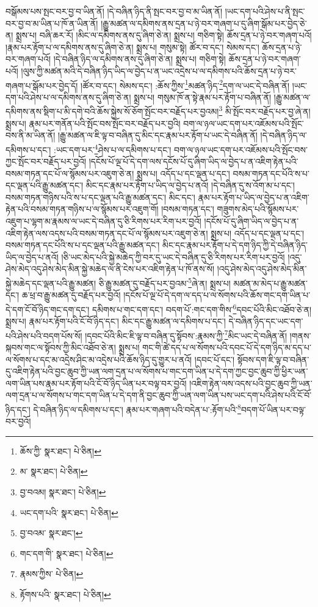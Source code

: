 བསྒོམས་པས་སྤང་བར་བྱ་བ་ཡིན་ནོ། །དེ་བཞིན་ཉིད་ནི་སྤང་བར་བྱ་བ་མ་ཡིན་ནོ། །ཡང་དག་པའི་ཤེས་པ་ནི་སྤང་བར་བྱ་བ་མ་ཡིན་པ་ཁོ་ན་ཡིན་ནོ། །རྒྱུ་མཚན་ལ་དམིགས་ནས་དྲན་པ་ཉེ་བར་གཞག་པ་དུ་ཞིག་སྒོམ་པར་བྱེད་ཅེ་ན། སྨྲས་པ། བཞི་ཆར་རོ། །མིང་ལ་དམིགས་ནས་དུ་ཞིག་ཅེ་ན། སྨྲས་པ། གཅིག་སྟེ། ཆོས་དྲན་པ་ཉེ་བར་གཞག་པའོ། །རྣམ་པར་རྟོག་པ་ལ་དམིགས་ནས་དུ་ཞིག་ཅེ་ན། སྨྲས་པ། གསུམ་སྟེ། ཚོར་བ་དང་། སེམས་དང་། ཆོས་དྲན་པ་ཉེ་བར་གཞག་པའོ། །དེ་བཞིན་ཉིད་ལ་དམིགས་ནས་དུ་ཞིག་ཅེ་ན། སྨྲས་པ། གཅིག་སྟེ། ཆོས་དྲན་པ་ཉེ་བར་གཞག་པའོ། །ལུས་ཀྱི་མཚན་མའི་དེ་བཞིན་ཉིད་ཡིད་ལ་བྱེད་པ་ན་ཡང་འདྲེས་པ་ལ་དམིགས་པའི་ཆོས་དྲན་པ་ཉེ་བར་གཞག་པ་སྒོམ་པར་བྱེད་དོ། །ཚོར་བ་དང་། སེམས་དང་། :ཆོས་ཀྱིས་\footnote{ཆོས་ཀྱི་  སྣར་ཐང་།  པེ་ཅིན། }མཚན་ཉིད་\footnote{མ་  སྣར་ཐང་།  པེ་ཅིན། }དག་ལ་ཡང་དེ་བཞིན་ནོ། །ཡང་དག་པའི་ཤེས་པ་ལ་དམིགས་ནས་དུ་ཞིག་ཅེ་ན། སྨྲས་པ། གསུམ་ཁོ་ན་སྟེ་རྣམ་པར་རྟོག་པ་བཞིན་ནོ། །རྒྱུ་མཚན་ལ་དམིགས་ནས་སྡིག་པ་མི་དགེ་བའི་ཆོས་སྐྱེས་སོ་ཅོག་སྤོང་བར་བརྗོད་པར་བྱའམ།\footnote{བྱ་བའམ།  སྣར་ཐང་།  པེ་ཅིན། } མི་སྤོང་བར་བརྗོད་པར་བྱ་ཞེ་ན། སྨྲས་པ། རྣམ་པར་གནོན་པའི་སྤོང་བས་སྤོང་བར་བརྗོད་པར་བྱའི། བག་ལ་ཉལ་ཡང་དག་པར་འཇོམས་པའི་སྤོང་བས་ནི་མ་ཡིན་ནོ། །རྒྱུ་མཚན་ལ་ཇི་ལྟ་བ་བཞིན་དུ་མིང་དང་རྣམ་པར་རྟོག་པ་ཡང་དེ་བཞིན་ནོ། །དེ་བཞིན་ཉིད་ལ་དམིགས་པ་དང་། :ཡང་དག་པར་\footnote{ཡང་དག་པའི་  སྣར་ཐང་།  པེ་ཅིན། }ཤེས་པ་ལ་དམིགས་པ་དང་། བག་ལ་ཉལ་ཡང་དག་པར་འཇོམས་པའི་སྤོང་བས་ཀྱང་སྤོང་བར་བརྗོད་པར་བྱའོ། །དངོས་པོ་ལྔ་པོ་དེ་དག་ལས་དངོས་པོ་དུ་ཞིག་ཡིད་ལ་བྱེད་པ་ན་འཇིག་རྟེན་པའི་བསམ་གཏན་དང་པོ་ལ་སྙོམས་པར་འཇུག་ཅེ་ན། སྨྲས་པ། འདོད་པ་དང་ལྡན་པ་དང་། བསམ་གཏན་དང་པོའི་ས་པ་དང་ལྡན་པའི་རྒྱུ་མཚན་དང་། མིང་དང་རྣམ་པར་རྟོག་པ་ཡིད་ལ་བྱེད་པ་ནའོ། །དེ་བཞིན་དུ་ས་འོག་མ་པ་དང་། བསམ་གཏན་གཉིས་པའི་ས་པ་དང་ལྡན་པའི་རྒྱུ་མཚན་དང་། མིང་དང་། རྣམ་པར་རྟོག་པ་ཡིད་ལ་བྱེད་པ་ན་འཇིག་རྟེན་པའི་བསམ་གཏན་གཉིས་པ་ལ་སྙོམས་པར་འཇུག་གོ། །བསམ་གཏན་དང་། གཟུགས་མེད་པའི་སྙོམས་པར་འཇུག་པ་ལྷག་མ་རྣམས་ལ་ཡང་དེ་བཞིན་དུ་ཅི་རིགས་པར་རིག་པར་བྱའོ། །དངོས་པོ་དུ་ཞིག་ཡིད་ལ་བྱེད་པ་ན་འཇིག་རྟེན་ལས་འདས་པའི་བསམ་གཏན་དང་པོ་ལ་སྙོམས་པར་འཇུག་ཅེ་ན། སྨྲས་པ། འདོད་པ་དང་ལྡན་པ་དང་། བསམ་གཏན་དང་པོའི་ས་པ་དང་ལྡན་པའི་རྒྱུ་མཚན་དང་། མིང་དང་རྣམ་པར་རྟོག་པ་དེ་དག་ཉིད་ཀྱི་དེ་བཞིན་ཉིད་ཡིད་ལ་བྱེད་པ་ནའོ། །ཅི་ཡང་མེད་པའི་སྐྱེ་མཆེད་ཀྱི་བར་དུ་ཡང་དེ་བཞིན་དུ་ཅི་རིགས་པར་རིག་པར་བྱའོ། །འདུ་ཤེས་མེད་འདུ་ཤེས་མེད་མིན་སྐྱེ་མཆེད་ལ་ནི་ངེས་པར་འཇིག་རྟེན་པ་ཁོ་ནས་སོ། །འདུ་ཤེས་མེད་འདུ་ཤེས་མེད་མིན་སྐྱེ་མཆེད་དང་ལྡན་པའི་རྒྱུ་མཚན། ཅི་རྒྱུ་མཚན་དུ་བརྗོད་པར་བྱའམ་\footnote{བྱ་བའམ་  སྣར་ཐང་། }ཞེ་ན། སྨྲས་པ། མཚན་མ་མེད་པ་རྒྱུ་མཚན་དང་། ཆ་ཕྲ་བ་རྒྱུ་མཚན་དུ་བརྗོད་པར་བྱའོ། །དངོས་པོ་ལྔ་པོ་དེ་དག་ལ་དད་པ་ལ་སོགས་པའི་ཆོས་གང་དག་ཡིན་པ་དེ་དག་ངོ་བོ་ཉིད་གང་དག་དང་། དམིགས་པ་གང་དག་དང་། བདག་པོ་:གང་དག་གིས་\footnote{གང་དག་གི་  སྣར་ཐང་།  པེ་ཅིན། }དབང་པོའི་མིང་འཐོབ་ཅེ་ན། སྨྲས་པ། རྣམ་པར་རྟོག་པའི་ངོ་བོ་ཉིད་དང་། མིང་དང་རྒྱུ་མཚན་ལ་དམིགས་པ་དང་། དེ་བཞིན་ཉིད་དང་ཡང་དག་པའི་ཤེས་པའི་བདག་པོས་སོ། །དབང་པོའི་མིང་ཇི་ལྟ་བ་བཞིན་དུ་སྟོབས་:རྣམས་ཀྱི་\footnote{རྣམས་ཀྱིས་  པེ་ཅིན། }མིང་ཡང་དེ་བཞིན་ནོ། །གནས་སྐབས་གང་ལ་སྟོབས་ཀྱི་མིང་འཐོབ་ཅེ་ན། སྨྲས་པ། གང་གི་ཚེ་དད་པ་ལ་སོགས་པའི་དབང་པོ་དེ་དག་ཉིད་མ་དད་པ་ལ་སོགས་པ་དང་མ་འདྲེས་ཤིང་མ་འདྲེས་པའི་ཆོས་ཉིད་དུ་གྱུར་པ་ནའོ། །དབང་པོ་དང་། སྟོབས་དག་ཇི་ལྟ་བ་བཞིན་དུ་འཇིག་རྟེན་པའི་བྱང་ཆུབ་ཀྱི་ཡན་ལག་དྲན་པ་ལ་སོགས་པ་གང་དག་ཡིན་པ་དེ་དག་ཀྱང་བྱང་ཆུབ་ཀྱི་ཕྱིར་ཡན་ལག་ཡིན་པས་རྣམ་པར་རྟོག་པའི་ངོ་བོ་ཉིད་ཡིན་པར་བལྟ་བར་བྱའོ། །འཇིག་རྟེན་ལས་འདས་པའི་བྱང་ཆུབ་ཀྱི་ཡན་ལག་དྲན་པ་ལ་སོགས་པ་གང་དག་ཡིན་པ་དེ་དག་ནི་བྱང་ཆུབ་ཀྱི་ཡན་ལག་ཡིན་པས་ཡང་དག་པའི་ཤེས་པའི་ངོ་བོ་ཉིད་དང་། དེ་བཞིན་ཉིད་ལ་དམིགས་པ་དང་། རྣམ་པར་གཞག་པའི་བདེན་པ་:རྟོག་པའི་\footnote{རྟོགས་པའི་  སྣར་ཐང་།  པེ་ཅིན། }བདག་པོ་ཡིན་པར་བལྟ་བར་བྱའོ། 